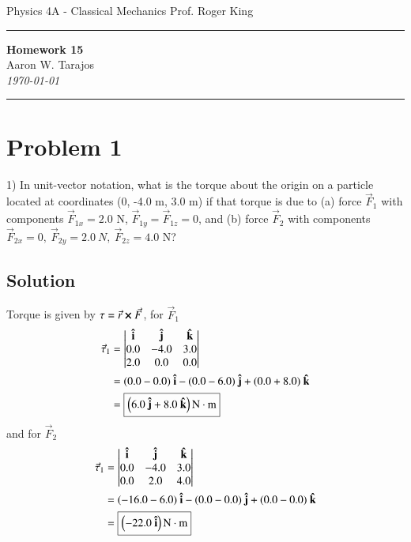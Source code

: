 \documentclass{article}
\begin{document}
\noindent
Physics 4A - Classical Mechanics \hfill Prof. Roger King

\noindent\rule{\textwidth}{0.4pt}

\begin{center}
    \textbf{\LARGE Homework 15} \\
    \vspace{12pt}
    \large Aaron W. Tarajos \\
    \textit{\today}
\end{center}

\noindent\rule{\textwidth}{0.4pt}

\section*{Problem 1}

1) In unit-vector notation, what is the torque about the origin on a particle located at coordinates (0, -4.0 m, 3.0 m) if that torque is due to (a) force $\vec{F}_1$ with components $\vec{F}_{1x} = 2.0$ N, $\vec{F}_{1y} = \vec{F}_{1z} = 0$, and (b) force $\vec{F}_2$ with components $\vec{F}_{2x} = 0,\ \vec{F}_{2y} = 2.0\ N,\ \vec{F}_{2z} = 4.0$ N?

\subsection*{Solution}
Torque is given by $\tau = \vec r \cross \vec F$, for $\vec F_1$
\begin{align*}
	\vec \tau_1 &= \begin{vmatrix}
		\vu i & \vu j & \vu k \\
		0.0 & -4.0 & 3.0 \\
		2.0 & 0.0 & 0.0
		\end{vmatrix} \\
		    &= (0.0-0.0)\ \vu i - (0.0-6.0)\ \vu j + (0.0+8.0)\ \vu k \\
		    &= \boxed{\left(6.0\ \vu j + 8.0\ \vu k \right) \text{N}\cdot\text{m}}
\end{align*}
and for $\vec F_2$
\begin{align*}
	\vec \tau_1 &= \begin{vmatrix}
		\vu i & \vu j & \vu k \\
		0.0 & -4.0 & 3.0 \\
		0.0 & 2.0 & 4.0
		\end{vmatrix} \\
		    &= (-16.0-6.0)\ \vu i - (0.0-0.0)\ \vu j + (0.0-0.0)\ \vu k \\
		    &= \boxed{\left(-22.0\ \vu i\right) \text{N}\cdot\text{m}}
\end{align*}
\end{document}
